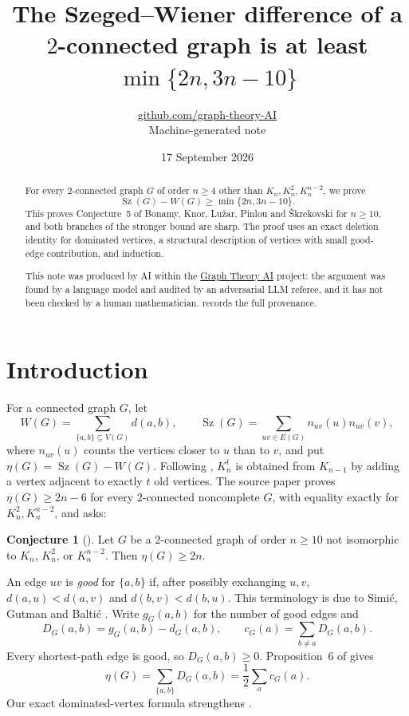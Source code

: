 \documentclass[11pt,a4paper]{article}
\title{The Szeged--Wiener difference of a $2$-connected graph is at least $\min\{2n,3n-10\}$}
\author{\href{https://github.com/graph-theory-AI}{github.com/graph-theory-AI}\\[2pt] \normalsize Machine-generated note}
\date{17 September 2026}
\theoremstyle{plain}
\theoremstyle{definition}
\newtheorem{conjecture}[theorem]{Conjecture}
\theoremstyle{remark}
\newcommand{\Sz}{\operatorname{Sz}}
\newcommand{\Wi}{W}
\newcommand{\dist}{d}
\begin{document}
\maketitle
\begin{abstract}
For every $2$-connected graph $G$ of order $n\ge4$ other than
$K_n,K_n^2,K_n^{n-2}$, we prove
\[
 \Sz(G)-\Wi(G)\ge\min\{2n,3n-10\}.
\]
This proves Conjecture~5 of Bonamy, Knor, Lu\v{z}ar, Pinlou and
\v{S}krekovski for $n\ge10$, and both branches of the stronger bound are
sharp. The proof uses an exact deletion identity for dominated vertices,
a structural description of vertices with small good-edge contribution,
and induction.

\medskip\noindent\small
This note was produced by AI within the \href{https://github.com/graph-theory-AI/Graph-Theory-LLM-Proofs}{Graph Theory AI}
project: the argument was found by a language model and audited by an adversarial LLM
referee, and it has not been checked by a human mathematician. 
records the full provenance.
\end{abstract}

\section{Introduction}
For a connected graph $G$, let
\[
 \Wi(G)=\sum_{\{a,b\}\subseteq V(G)}\dist(a,b),\qquad
 \Sz(G)=\sum_{uv\in E(G)}n_{uv}(u)n_{uv}(v),
\]
where $n_{uv}(u)$ counts the vertices closer to $u$ than to $v$, and put
$\eta(G)=\Sz(G)-\Wi(G)$. Following \cite{BKLPS17}, $K_n^t$ is obtained
from $K_{n-1}$ by adding a vertex adjacent to exactly $t$ old vertices.
The source paper proves $\eta(G)\ge2n-6$ for every $2$-connected
noncomplete $G$, with equality exactly for $K_n^2,K_n^{n-2}$, and asks:

\begin{conjecture}[{\cite[Conjecture~5]{BKLPS17}}]\label{conj:source}
Let $G$ be a $2$-connected graph of order $n\geq 10$ not isomorphic to
$K_n$, $K^2_n$, or $K^{n-2}_n$. Then $\eta(G)\geq 2n$.
\end{conjecture}

An edge $uv$ is \emph{good} for $\{a,b\}$ if, after possibly exchanging
$u,v$, $d(a,u)<d(a,v)$ and $d(b,v)<d(b,u)$. This terminology is due to
Simi\'c, Gutman and Balti\'c \cite{SGB00}. Write $g_G(a,b)$ for the number
of good edges and
\[
 D_G(a,b)=g_G(a,b)-d_G(a,b),\qquad c_G(a)=\sum_{b\ne a}D_G(a,b).
\]
Every shortest-path edge is good, so $D_G(a,b)\ge0$. Proposition~6 of
\cite{BKLPS17} gives
\begin{equation}\label{eq:good}
 \eta(G)=\sum_{\{a,b\}}D_G(a,b)=\frac12\sum_a c_G(a).
\end{equation}
Our exact dominated-vertex formula strengthens \cite[Lemma~7]{BKLPS17}.
\end{document}
